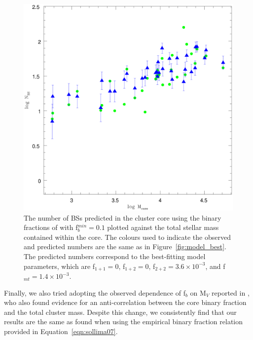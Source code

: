 \begin{figure} [!h]
  \begin{center}
 \includegraphics[scale=0.5]{Chapter-5/fig3.eps}
\caption[The predicted number of BSs plotted versus the total stellar
mass in the core for the best-fitting model parameters found using the binary
fractions of \citet{sollima07} with f$_b^{min} = 0.1$]{The number of BSs
  predicted in the cluster core using the binary fractions of
  \citet{sollima07} with f$_b^{min} = 0.1$ plotted against the total
  stellar mass contained within the core.  The
  colours used to indicate the observed and predicted numbers are the
  same as in Figure~\ref{fig:model_best}.  The predicted numbers correspond to
  the best-fitting model parameters, which are f$_{1+1} = 0$,
  f$_{1+2} = 0$, f$_{2+2} = 3.6 \times 10^{-3}$, and f$_{mt} = 1.4
  \times 10^{-3}$.
\label{fig:model_best_rmax_sollima_10min_tBS15}}
\end{center}
\end{figure}

Finally, we also tried adopting the observed dependence of f$_b$ on
M$_V$ reported in \citet{milone08}, who also found evidence for an
anti-correlation between the core binary fraction and the total
cluster mass.  Despite this change, we consistently find that our
results are the same as found when using the empirical binary fraction
relation provided in Equation~\ref{eqn:sollima07}.

